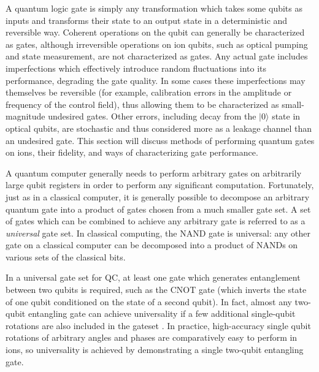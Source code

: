 \documentclass[%
12pt,
 amsmath,amssymb,
]{revtex4-2}
\newcommand{\zero}{|0 \rangle}
\begin{document}
A quantum logic gate is simply any transformation which takes some qubits as inputs and transforms their state to an output state in a deterministic and reversible way. Coherent operations on the qubit can generally be characterized as gates, although irreversible operations on ion qubits, such as optical pumping and state measurement, are not characterized as gates. Any actual gate includes imperfections which effectively introduce random fluctuations into its performance, degrading the gate quality. In some cases these imperfections may themselves be reversible (for example, calibration errors in the amplitude or frequency of the control field), thus allowing them to be characterized as small-magnitude undesired gates. Other errors, including decay from the $\zero$ state in optical qubits, are stochastic and thus considered more as a leakage channel than an undesired gate. This section will discuss methods of performing quantum gates on ions, their fidelity, and ways of characterizing gate performance.

A quantum computer generally needs to perform arbitrary gates on arbitrarily large qubit registers in order to perform any significant computation. Fortunately, just as in a classical computer, it is generally possible to decompose an arbitrary quantum gate into a product of gates chosen from a much smaller gate set. A set of gates which can be combined to achieve any arbitrary gate is referred to as a \emph{universal} gate set. In classical computing, the NAND gate is universal: any other gate on a classical computer can be decomposed into a product of NANDs on various sets of the classical bits.

In a universal gate set for QC, at least one gate which generates entanglement between two qubits is required, such as the CNOT gate (which inverts the state of one qubit conditioned on the state of a second qubit). In fact, almost any two-qubit entangling gate can achieve universality if a few additional single-qubit rotations are also included in the gateset \cite{LloydAlmostAny1995, DiVincenzoUniversal2Qgate1995}. In practice, high-accuracy single qubit rotations of arbitrary angles and phases are comparatively easy to perform in ions, so universality is achieved by demonstrating a single two-qubit entangling gate.

\end{document}
